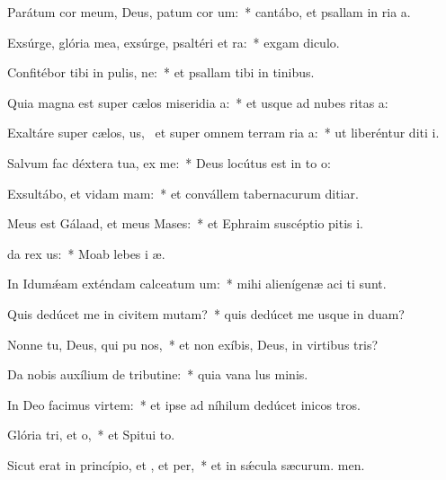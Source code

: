 \item Parátum cor meum, Deus, patum cor um:~* cantábo, et psallam in ria a.
\item Exsúrge, glória mea, exsúrge, psaltéri et ra:~* exgam diculo.
\item Confitébor tibi in pulis, ne:~* et psallam tibi in tinibus.
\item Quia magna est super cælos miseridia a:~* et usque ad nubes ritas a:
\item Exaltáre super cælos, us,~\pscross{} et super omnem terram ria a:~* ut liberéntur diti i.
\item Salvum fac déxtera tua,  ex me:~* Deus locútus est in to o:
\item Exsultábo, et vidam mam:~* et convállem tabernacurum ditiar.
\item Meus est Gálaad, et meus  Mases:~* et Ephraim suscéptio pitis i.
\item {}da rex us:~* Moab lebes i æ.
\item In Idumǽam exténdam calceatum um:~* mihi alienígenæ aci ti sunt.
\item Quis dedúcet me in civitem mutam?~* quis dedúcet me usque in duam?
\item Nonne tu, Deus, qui pu nos,~* et non exíbis, Deus, in virtibus tris?
\item Da nobis auxílium de tributine:~* quia vana lus minis.
\item In Deo facimus virtem:~* et ipse ad níhilum dedúcet inicos tros.
\item Glória tri, et o,~* et Spitui to.
\item Sicut erat in princípio, et , et per,~* et in sǽcula sæcurum. men.
